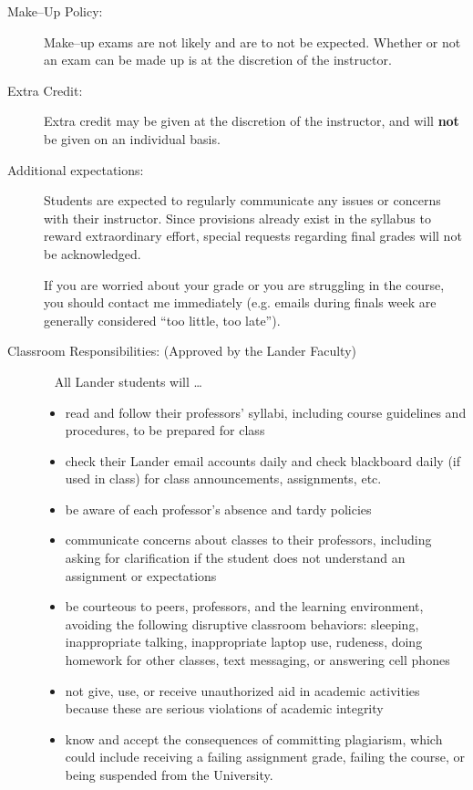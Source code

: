 \message{ !name(policies.tex)}\documentclass{article}
\begin{document}

  \begin{description}
\item[Make--Up Policy:] Make--up exams are not likely and are to not be expected. Whether or not an exam can be made up is at the discretion of the instructor.

\item[Extra Credit:] Extra credit may be given at the discretion of the instructor, and will \textbf{not} be given on an individual basis.

\item[Additional expectations:]
  Students are expected to regularly communicate any issues or concerns with their instructor. Since provisions already exist in the syllabus to reward extraordinary effort, special requests regarding final grades will not be acknowledged.

  If you are worried about your grade or you are struggling in the course, you should contact me immediately (e.g. emails during finals week are generally considered ``too little, too late'').

\item[Classroom Responsibilities: (Approved by the Lander Faculty)]\ \newline
  All Lander students will \dots
  \begin{itemize}
    \item read and follow their professors' syllabi, including course guidelines and procedures, to be prepared for class
    \item check their Lander email accounts daily and check blackboard daily (if used in class) for class announcements, assignments, etc.
    \item be aware of each professor’s absence and tardy policies
    \item communicate concerns about classes to their professors, including asking for clarification if the student does not understand an assignment or expectations
    \item be courteous to peers, professors, and the learning environment, avoiding the following disruptive classroom behaviors: sleeping, inappropriate talking, inappropriate laptop use, rudeness, doing homework for other classes, text messaging, or answering cell phones
    \item not give, use, or receive unauthorized aid in academic activities because these are serious violations of academic integrity
    \item know and accept the consequences of committing plagiarism, which could include receiving a failing assignment grade, failing the course, or being suspended from the University.
  \end{itemize}


\end{description}
\end{document}
